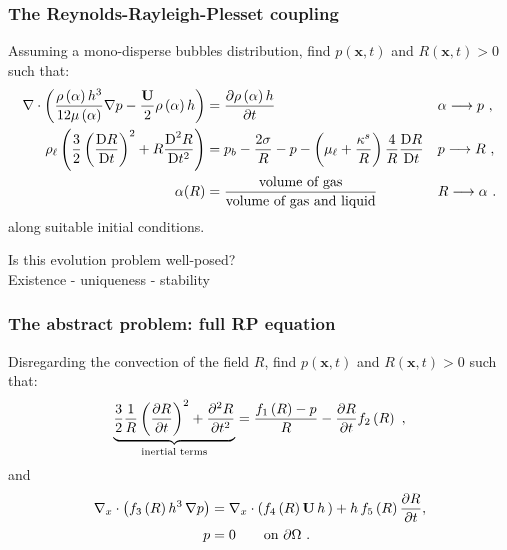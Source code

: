 \documentclass[10pt,aspectratio=169]{beamer}
\begin{document}
\begin{frame}
\frametitle{The Reynolds-Rayleigh-Plesset coupling}
Assuming a mono-disperse bubbles distribution, find $p(\mathbf{x},t)$ and $R(\mathbf{x},t)>0$ such that:
\begin{align*}
\nabla\cdot\left(\frac{\rho\left(\alpha\right) h^3}{12\mu\left(\alpha\right) }\nabla p-\frac{\mathbf{U}}{2}\rho\left(\alpha\right) h \right)&=\frac{\partial \rho\left(\alpha\right) h}{\partial t}&&\alpha \longrightarrow p~,\\
\rho_\ell\left(\frac{3}{2}\left(\frac{\mbox{D} R}{\mbox{D} t}\right)^2+R\frac{\mbox{D}^2 R}{\mbox{D} {t}^2}\right)&=p_b-\frac{2\sigma}{R}-p-\left(\mu_\ell+\frac{\kappa^s}{R}\right)\frac{4}{R}\frac{\mbox{D} R}{\mbox{D} t}&&p\longrightarrow R~,\\
\alpha(R)&=\frac{\mbox{volume of gas}}{\mbox{volume of gas and liquid}}&&R\longrightarrow \alpha~.
\end{align*}
along suitable initial conditions.
\begin{center}
	Is this evolution problem  well-posed?\\
	Existence - uniqueness - stability
\end{center}
\end{frame} 


\begin{frame}
\frametitle{The abstract problem: full RP equation}
Disregarding the convection of the field $R$, find $p(\mathbf{x},t)$ and $R(\mathbf{x},t)>0$ such that:
\begin{equation}
\underbrace{\frac{3}{2}\frac{1}{R}\left(\frac{\partial R}{\partial t}\right)^2+\frac{\partial^2 R}{\partial t^2}}_{\textnormal{inertial terms}}=\frac{f_1\left(R\right)-p}{R}-\frac{\partial R}{\partial t}f_2\left(R\right)~,\label{eq:abstract-rp1}
\end{equation}
and
\begin{align}
\begin{split}
\nabla_x\cdot \left(f_3\left(R\right) h^3\,\nabla p\right)&=\nabla_x\cdot \left(f_4\left(R\right)\mathbf{U}\,h\,\right)+h\,f_5\left(R\right)\frac{\partial R}{\partial t},\\
p&=0 \qquad\mbox{on } \partial \Omega~.
\end{split}
\label{eq:abstract-reynolds1}
\end{align}

\end{frame} 

\end{document}
